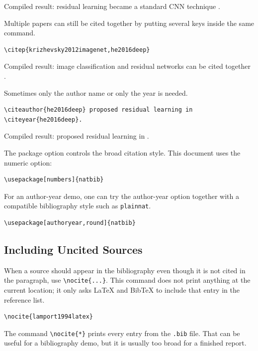 \documentclass[11pt,a4paper]{article}
\begin{document}
Compiled result: residual learning became a standard CNN technique
\citep{he2016deep}.

Multiple papers can still be cited together by putting several keys inside the
same command.

\begin{verbatim}
\citep{krizhevsky2012imagenet,he2016deep}
\end{verbatim}

Compiled result: image classification and residual networks can be cited
together \citep{krizhevsky2012imagenet,he2016deep}.

Sometimes only the author name or only the year is needed.

\begin{verbatim}
\citeauthor{he2016deep} proposed residual learning in \citeyear{he2016deep}.
\end{verbatim}

Compiled result: \citeauthor{he2016deep} proposed residual learning in
\citeyear{he2016deep}.

The package option controls the broad citation style. This document uses the
numeric option:

\begin{verbatim}
\usepackage[numbers]{natbib}
\end{verbatim}

For an author-year demo, one can try the author-year option together with a
compatible bibliography style such as \texttt{plainnat}.

\begin{verbatim}
\usepackage[authoryear,round]{natbib}
\end{verbatim}

\subsection{Including Uncited Sources}

When a source should appear in the bibliography even though it is not cited in
the paragraph, use \verb|\nocite{...}|. This command does not print anything at
the current location; it only asks LaTeX and BibTeX to include that entry in the
reference list.

\begin{verbatim}
\nocite{lamport1994latex}
\end{verbatim}

\nocite{lamport1994latex}

The command \verb|\nocite{*}| prints every entry from the \texttt{.bib} file.
That can be useful for a bibliography demo, but it is usually too broad for a
finished report.
\end{document}
